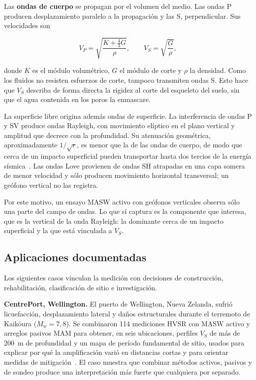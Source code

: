 Las \textbf{ondas de cuerpo} se propagan por el volumen del medio. Las ondas P producen
desplazamiento paralelo a la propagación y las S, perpendicular. Sus velocidades son

\begin{equation}
    V_P=\sqrt{\frac{K+\frac{4}{3}G}{\rho}},
    \qquad
    V_S=\sqrt{\frac{G}{\rho}},
\end{equation}

donde $K$ es el módulo volumétrico, $G$ el módulo de corte y $\rho$ la densidad. Como los
fluidos no resisten esfuerzos de corte, tampoco transmiten ondas S. Esto hace que $V_S$
describa de forma directa la rigidez al corte del esqueleto del suelo, sin que el agua
contenida en los poros la enmascare.

La superficie libre origina además ondas de superficie. La interferencia de ondas P y
SV produce ondas Rayleigh, con movimiento elíptico en el plano vertical y amplitud que
decrece con la profundidad. Su atenuación geométrica, aproximadamente $1/\sqrt{r}$, es
menor que la de las ondas de cuerpo, de modo que cerca de un impacto superficial pueden
transportar hasta dos tercios de la energía sísmica~\cite{Foti2014,Kramer1996}. Las
ondas Love provienen de ondas SH atrapadas en una capa somera de menor velocidad y sólo
producen movimiento horizontal transversal; un geófono vertical no las registra.

Por este motivo, un ensayo MASW activo con geófonos verticales observa sólo una parte
del campo de ondas. Lo que sí captura es la componente que interesa, que es la vertical
de la onda Rayleigh: la dominante cerca de un impacto superficial y la que está
vinculada a $V_S$.

\subsection{Aplicaciones documentadas}

Los siguientes casos vinculan la medición con decisiones de construcción,
rehabilitación, clasificación de sitio e investigación.

\textbf{CentrePort, Wellington.} El puerto de Wellington, Nueva Zelanda, sufrió
licuefacción, desplazamiento lateral y daños estructurales durante el terremoto de
Kaik\={o}ura ($M_w=7{,}8$). Se combinaron 114 mediciones HVSR con MASW activo y arreglos
pasivos MAM para obtener, en seis ubicaciones, perfiles $V_S$ de más de \SI{200}{\meter}
de profundidad y un mapa de período fundamental de sitio, usados para explicar por qué
la amplificación varió en distancias cortas y para orientar medidas de
mitigación~\cite{Vantassel2018}. El caso muestra que combinar métodos activos, pasivos y
de sondeo produce una interpretación más fuerte que cualquiera por separado.

